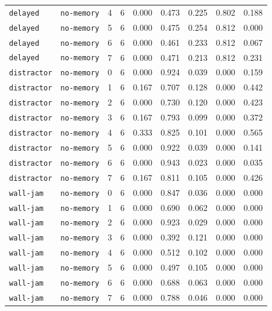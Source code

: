 \documentclass{article}
\begin{document}
\begin{center}
\begin{tabular}{lllcccccc}
\texttt{delayed} & \texttt{no-memory} & 4 & 6 & 0.000 & 0.473 & 0.225 & 0.802 & 0.188 \\
\texttt{delayed} & \texttt{no-memory} & 5 & 6 & 0.000 & 0.475 & 0.254 & 0.812 & 0.000 \\
\texttt{delayed} & \texttt{no-memory} & 6 & 6 & 0.000 & 0.461 & 0.233 & 0.812 & 0.067 \\
\texttt{delayed} & \texttt{no-memory} & 7 & 6 & 0.000 & 0.471 & 0.213 & 0.812 & 0.231 \\
\texttt{distractor} & \texttt{no-memory} & 0 & 6 & 0.000 & 0.924 & 0.039 & 0.000 & 0.159 \\
\texttt{distractor} & \texttt{no-memory} & 1 & 6 & 0.167 & 0.707 & 0.128 & 0.000 & 0.442 \\
\texttt{distractor} & \texttt{no-memory} & 2 & 6 & 0.000 & 0.730 & 0.120 & 0.000 & 0.423 \\
\texttt{distractor} & \texttt{no-memory} & 3 & 6 & 0.167 & 0.793 & 0.099 & 0.000 & 0.372 \\
\texttt{distractor} & \texttt{no-memory} & 4 & 6 & 0.333 & 0.825 & 0.101 & 0.000 & 0.565 \\
\texttt{distractor} & \texttt{no-memory} & 5 & 6 & 0.000 & 0.922 & 0.039 & 0.000 & 0.141 \\
\texttt{distractor} & \texttt{no-memory} & 6 & 6 & 0.000 & 0.943 & 0.023 & 0.000 & 0.035 \\
\texttt{distractor} & \texttt{no-memory} & 7 & 6 & 0.167 & 0.811 & 0.105 & 0.000 & 0.426 \\
\texttt{wall-jam} & \texttt{no-memory} & 0 & 6 & 0.000 & 0.847 & 0.036 & 0.000 & 0.000 \\
\texttt{wall-jam} & \texttt{no-memory} & 1 & 6 & 0.000 & 0.690 & 0.062 & 0.000 & 0.000 \\
\texttt{wall-jam} & \texttt{no-memory} & 2 & 6 & 0.000 & 0.923 & 0.029 & 0.000 & 0.000 \\
\texttt{wall-jam} & \texttt{no-memory} & 3 & 6 & 0.000 & 0.392 & 0.121 & 0.000 & 0.000 \\
\texttt{wall-jam} & \texttt{no-memory} & 4 & 6 & 0.000 & 0.512 & 0.102 & 0.000 & 0.000 \\
\texttt{wall-jam} & \texttt{no-memory} & 5 & 6 & 0.000 & 0.497 & 0.105 & 0.000 & 0.000 \\
\texttt{wall-jam} & \texttt{no-memory} & 6 & 6 & 0.000 & 0.688 & 0.063 & 0.000 & 0.000 \\
\texttt{wall-jam} & \texttt{no-memory} & 7 & 6 & 0.000 & 0.788 & 0.046 & 0.000 & 0.000 \\
\bottomrule
\end{tabular}
\end{center}
\end{document}
